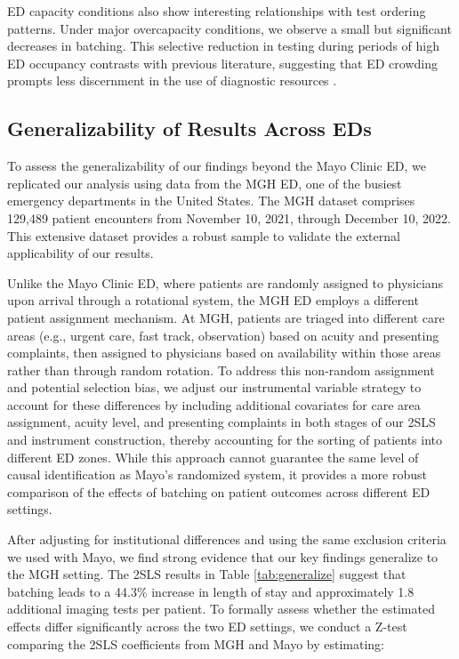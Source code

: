 \documentclass[,,nonblindrev]{informs}
\begin{document}
ED capacity conditions also show interesting relationships with test
ordering patterns. Under major overcapacity conditions, we observe a
small but significant decreases in batching. This selective reduction in
testing during periods of high ED occupancy contrasts with previous
literature, suggesting that ED crowding prompts less discernment in the
use of diagnostic resources \citep{pines2009trends}.

\subsection{Generalizability of Results Across
EDs}\label{sec:generalize}

To assess the generalizability of our findings beyond the Mayo Clinic
ED, we replicated our analysis using data from the MGH ED, one of the
busiest emergency departments in the United States. The MGH dataset
comprises 129,489 patient encounters from November 10, 2021, through
December 10, 2022. This extensive dataset provides a robust sample to
validate the external applicability of our results.

Unlike the Mayo Clinic ED, where patients are randomly assigned to
physicians upon arrival through a rotational system, the MGH ED employs
a different patient assignment mechanism. At MGH, patients are triaged
into different care areas (e.g., urgent care, fast track, observation)
based on acuity and presenting complaints, then assigned to physicians
based on availability within those areas rather than through random
rotation. To address this non-random assignment and potential selection
bias, we adjust our instrumental variable strategy to account for these
differences by including additional covariates for care area assignment,
acuity level, and presenting complaints in both stages of our 2SLS and
instrument construction, thereby accounting for the sorting of patients
into different ED zones. While this approach cannot guarantee the same
level of causal identification as Mayo's randomized system, it provides
a more robust comparison of the effects of batching on patient outcomes
across different ED settings.

After adjusting for institutional differences and using the same
exclusion criteria we used with Mayo, we find strong evidence that our
key findings generalize to the MGH setting. The 2SLS results in Table
\ref{tab:generalize} suggest that batching leads to a 44.3\% increase in
length of stay and approximately 1.8 additional imaging tests per
patient. To formally assess whether the estimated effects differ
significantly across the two ED settings, we conduct a Z-test comparing
the 2SLS coefficients from MGH and Mayo by estimating:
\end{document}
